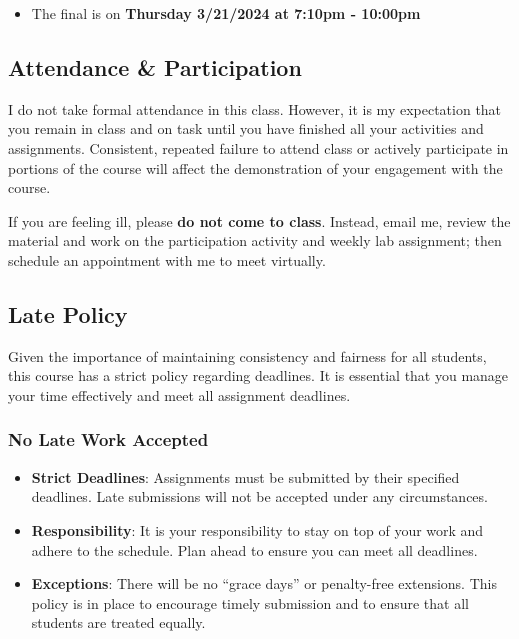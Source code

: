 \documentclass[
  11pt,
  letterpaper,
  DIV=11,
  numbers=noendperiod]{scrartcl}
\providecommand{\tightlist}{%
  \setlength{\itemsep}{0pt}\setlength{\parskip}{0pt}}\usepackage{longtable,booktabs,array}
\begin{document}
\begin{itemize}
\tightlist
\item
  The final is on \textbf{Thursday 3/21/2024 at 7:10pm - 10:00pm}
\end{itemize}

\hypertarget{attendance-participation}{%
\subsection{Attendance \&
Participation}\label{attendance-participation}}

I do not take formal attendance in this class. However, it is my
expectation that you remain in class and on task until you have finished
all your activities and assignments. Consistent, repeated failure to
attend class or actively participate in portions of the course will
affect the demonstration of your engagement with the course.

If you are feeling ill, please \textbf{do not come to class}. Instead,
email me, review the material and work on the participation activity and
weekly lab assignment; then schedule an appointment with me to meet
virtually.

\hypertarget{late-policy}{%
\subsection{Late Policy}\label{late-policy}}

Given the importance of maintaining consistency and fairness for all
students, this course has a strict policy regarding deadlines. It is
essential that you manage your time effectively and meet all assignment
deadlines.

\hypertarget{no-late-work-accepted}{%
\subsubsection{No Late Work Accepted}\label{no-late-work-accepted}}

\begin{itemize}
\tightlist
\item
  \textbf{Strict Deadlines}: Assignments must be submitted by their
  specified deadlines. Late submissions will not be accepted under any
  circumstances.
\item
  \textbf{Responsibility}: It is your responsibility to stay on top of
  your work and adhere to the schedule. Plan ahead to ensure you can
  meet all deadlines.
\item
  \textbf{Exceptions}: There will be no ``grace days'' or penalty-free
  extensions. This policy is in place to encourage timely submission and
  to ensure that all students are treated equally.
\end{itemize}
\end{document}
